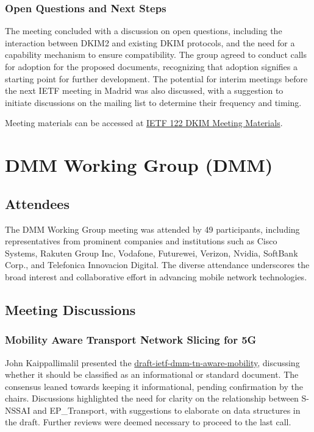 \documentclass{article}
\begin{document}
\subsubsection{Open Questions and Next Steps}

The meeting concluded with a discussion on open questions, including the interaction between DKIM2 and existing DKIM protocols, and the need for a capability mechanism to ensure compatibility. The group agreed to conduct calls for adoption for the proposed documents, recognizing that adoption signifies a starting point for further development. The potential for interim meetings before the next IETF meeting in Madrid was also discussed, with a suggestion to initiate discussions on the mailing list to determine their frequency and timing.

Meeting materials can be accessed at \href{https://datatracker.ietf.org/meeting/122/materials/agenda-122-dkim}{IETF 122 DKIM Meeting Materials}.



\newpage

\section{DMM Working Group (DMM)}

\subsection{Attendees}
The DMM Working Group meeting was attended by 49 participants, including representatives from prominent companies and institutions such as Cisco Systems, Rakuten Group Inc, Vodafone, Futurewei, Verizon, Nvidia, SoftBank Corp., and Telefonica Innovacion Digital. The diverse attendance underscores the broad interest and collaborative effort in advancing mobile network technologies.

\subsection{Meeting Discussions}

\subsubsection{Mobility Aware Transport Network Slicing for 5G}
John Kaippallimalil presented the \href{https://datatracker.ietf.org/doc/draft-ietf-dmm-tn-aware-mobility}{draft-ietf-dmm-tn-aware-mobility}, discussing whether it should be classified as an informational or standard document. The consensus leaned towards keeping it informational, pending confirmation by the chairs. Discussions highlighted the need for clarity on the relationship between S-NSSAI and EP\_Transport, with suggestions to elaborate on data structures in the draft. Further reviews were deemed necessary to proceed to the last call.
\end{document}

